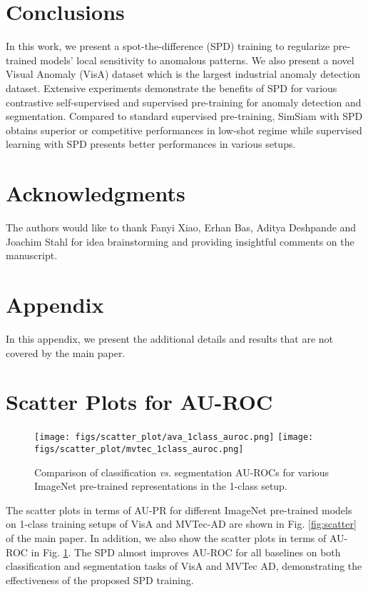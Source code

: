 \documentclass[runningheads]{llncs}
\begin{document}
\section{Conclusions}
In this work, we present a spot-the-difference (SPD) training to regularize pre-trained models' local sensitivity to anomalous patterns. We also present a novel Visual Anomaly (VisA) dataset which is the largest industrial anomaly detection dataset. Extensive experiments demonstrate the benefits of SPD for various contrastive self-supervised and supervised pre-training for anomaly detection and segmentation. Compared to standard supervised pre-training, SimSiam with SPD obtains superior or competitive performances in low-shot regime while supervised learning with SPD presents better performances in various setups. 

\section*{Acknowledgments}
The authors would like to thank Fanyi Xiao, Erhan Bas, Aditya Deshpande and Joachim Stahl for idea brainstorming
and providing insightful comments on the manuscript.




\clearpage

\section*{Appendix}
In this appendix, we present the additional details and
results that are not covered by the main paper.

\appendix

\section{Scatter Plots for AU-ROC}
\begin{figure}[!ht]
\centering
\texttt{[image: figs/scatter\_plot/ava\_1class\_auroc.png]}
\texttt{[image: figs/scatter\_plot/mvtec\_1class\_auroc.png]}\\
 \caption{Comparison of classification \textit{vs.} segmentation AU-ROCs for various ImageNet pre-trained representations in the 1-class setup.}
 \label{fig:scatter_auroc}
\end{figure}

The scatter plots in terms of AU-PR for different ImageNet pre-trained models on 1-class training setups of VisA and MVTec-AD are shown in Fig. \ref{fig:scatter} of the main paper. In addition, we also show the scatter plots in terms of AU-ROC in Fig. \ref{fig:scatter_auroc}. The SPD almost improves AU-ROC for all baselines on both classification and segmentation tasks of VisA and MVTec AD, demonstrating the effectiveness of the proposed SPD training.
\end{document}
